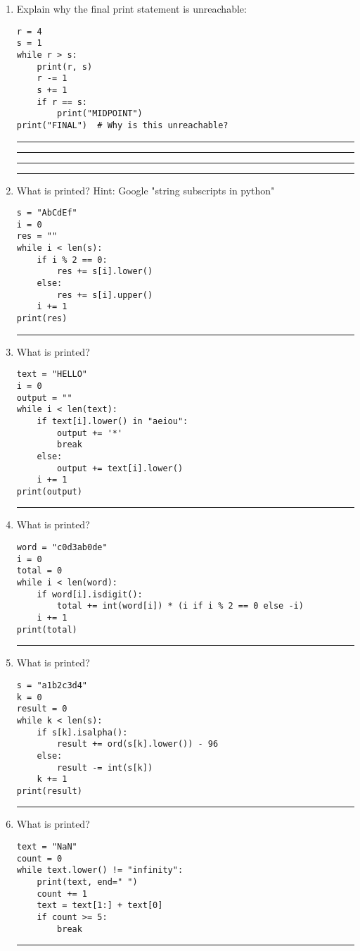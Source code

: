 \documentclass{article}
\begin{document}
\begin{enumerate}
    \item Explain why the final print statement is unreachable:
    \begin{lstlisting}
r = 4
s = 1
while r > s:
    print(r, s)
    r -= 1
    s += 1
    if r == s:
        print("MIDPOINT")
print("FINAL")  # Why is this unreachable?
    \end{lstlisting}
    \rule{\linewidth}{0.4pt} %
    \rule{\linewidth}{0.4pt} %
    \rule{\linewidth}{0.4pt} %
    \rule{\linewidth}{0.4pt} %
    \item What is printed? Hint: Google "string subscripts in python"
    \begin{lstlisting}
s = "AbCdEf"
i = 0
res = ""
while i < len(s):
    if i % 2 == 0:
        res += s[i].lower()
    else:
        res += s[i].upper()
    i += 1
print(res)
    \end{lstlisting}
    \rule{\linewidth}{0.4pt}
    
    \item What is printed?
    \begin{lstlisting}
text = "HELLO"
i = 0
output = ""
while i < len(text):
    if text[i].lower() in "aeiou":
        output += '*'
        break
    else:
        output += text[i].lower()
    i += 1
print(output)
    \end{lstlisting}
    \rule{\linewidth}{0.4pt}
    
    \item What is printed?
    \begin{lstlisting}
word = "c0d3ab0de"
i = 0
total = 0
while i < len(word):
    if word[i].isdigit():
        total += int(word[i]) * (i if i % 2 == 0 else -i)
    i += 1
print(total)
    \end{lstlisting}
    \rule{\linewidth}{0.4pt}
    
    \item What is printed?
    \begin{lstlisting}
s = "a1b2c3d4"
k = 0
result = 0
while k < len(s):
    if s[k].isalpha():
        result += ord(s[k].lower()) - 96
    else:
        result -= int(s[k])
    k += 1
print(result)
    \end{lstlisting}
    \rule{\linewidth}{0.4pt}
    
    \item What is printed?
    \begin{lstlisting}
text = "NaN"
count = 0
while text.lower() != "infinity":
    print(text, end=" ")
    count += 1
    text = text[1:] + text[0]
    if count >= 5:
        break
    \end{lstlisting}
    \rule{\linewidth}{0.4pt}
    

\end{enumerate}
\end{document}
